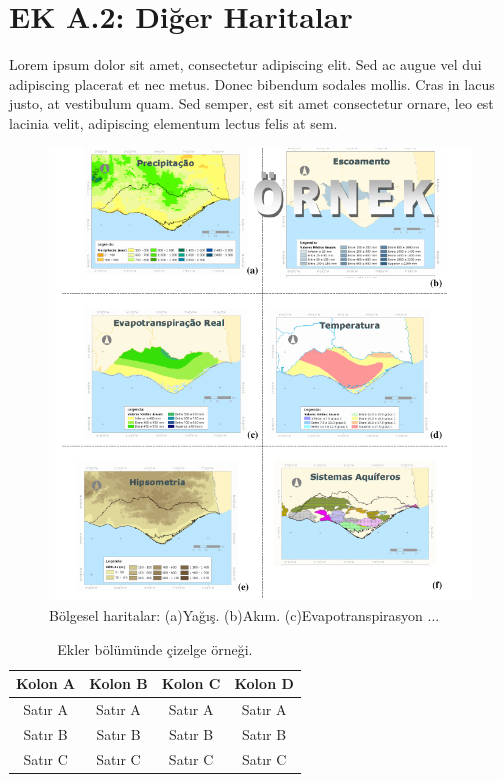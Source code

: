 \newpage{}

\chapter{EK A.2: Diğer Haritalar}

Lorem ipsum dolor sit amet, consectetur adipiscing elit. Sed ac augue
vel dui adipiscing placerat et nec metus. Donec bibendum sodales mollis.
Cras in lacus justo, at vestibulum quam. Sed semper, est sit amet
consectetur ornare, leo est lacinia velit, adipiscing elementum lectus
felis at sem.

\noindent 
\begin{figure}[h!]
\centering{}\includegraphics[width=430pt]{fig/haritalar} \caption{\label{fig:6-1-1}Bölgesel haritalar: (a)Yağış. (b)Akım. (c)Evapotranspirasyon
...}
\end{figure}

\noindent 
\begin{table}[!ht]
\caption{\label{tableappendix2-1}Ekler bölümünde çizelge örneği.}

\centering{}%
\begin{tabular}{cccc}
\hline 
Kolon A & Kolon B & Kolon C & Kolon D\tabularnewline
\hline 
Satır A & Satır A & Satır A & Satır A\tabularnewline
Satır B & Satır B & Satır B & Satır B\tabularnewline
Satır C & Satır C & Satır C & Satır C\tabularnewline
\hline 
\end{tabular}
\end{table}

